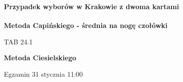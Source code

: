\documentclass[12pt,a4paper]{article}
\theoremstyle{break}
\begin{document}
		{\textbf{Przypadek wyborów w Krakowie z dwoma kartami}}\\\\
		
		{\textbf{Metoda Capińskiego - średnia na nogę czołówki}}
		
		TAB 24.1
		
		{\textbf{Metoda Ciesielskiego}}
	\begin{center}
		{\fontsize{30}{36}\selectfont\faBirthdayCake}
	\end{center} 
	
	Egzamin 31 stycznia 11:00
	
		
	
	

	
	
\end{document}
